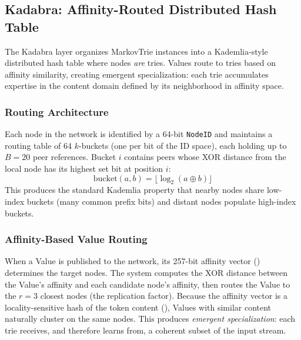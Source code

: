 \subsection{Kadabra: Affinity-Routed Distributed Hash Table}
\label{sec:kadabra_dht}

The Kadabra layer organizes MarkovTrie instances into a Kademlia-style
distributed hash table where nodes \emph{are} tries.  Values route to
tries based on affinity similarity, creating emergent specialization:
each trie accumulates expertise in the content domain defined by its
neighborhood in affinity space.

\subsubsection{Routing Architecture}

Each node in the network is identified by a 64-bit \texttt{NodeID} and
maintains a routing table of 64 $k$-buckets (one per bit of the ID
space), each holding up to $B = 20$ peer references.  Bucket $i$
contains peers whose XOR distance from the local node has its highest
set bit at position $i$:
\begin{equation}
  \text{bucket}(a, b)
    = \bigl\lfloor \log_2(a \oplus b) \bigr\rfloor
  \label{eq:bucket_index}
\end{equation}
This produces the standard Kademlia property that nearby nodes share
low-index buckets (many common prefix bits) and distant nodes populate
high-index buckets.

\subsubsection{Affinity-Based Value Routing}

When a Value is published to the network, its 257-bit affinity vector
() determines the target nodes.  The system
computes the XOR distance between the Value's affinity and each
candidate node's affinity, then routes the Value to the $r = 3$ closest
nodes (the replication factor).  Because the affinity vector is a
locality-sensitive hash of the token content
(), Values with similar content naturally
cluster on the same nodes.  This produces \emph{emergent specialization}:
each trie receives, and therefore learns from, a coherent subset of the
input stream.

